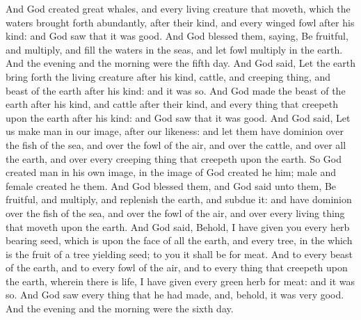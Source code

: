 \begin{biblechapter}
\verse And God created great whales, and every living creature that moveth, which the waters brought forth abundantly, after their kind, and every winged fowl after his kind: and God saw that it was good.
\verse And God blessed them, saying, Be fruitful, and multiply, and fill the waters in the seas, and let fowl multiply in the earth.
\verse And the evening and the morning were the fifth day.
\verse And God said, Let the earth bring forth the living creature after his kind, cattle, and creeping thing, and beast of the earth after his kind: and it was so.
\verse And God made the beast of the earth after his kind, and cattle after their kind, and every thing that creepeth upon the earth after his kind: and God saw that it was good.
\verse And God said, Let us make man in our image, after our likeness: and let them have dominion over the fish of the sea, and over the fowl of the air, and over the cattle, and over all the earth, and over every creeping thing that creepeth upon the earth.
\verse So God created man in his own image, in the image of God created he him; male and female created he them.
\verse And God blessed them, and God said unto them, Be fruitful, and multiply, and replenish the earth, and subdue it: and have dominion over the fish of the sea, and over the fowl of the air, and over every living thing that moveth upon the earth.
\verse And God said, Behold, I have given you every herb bearing seed, which is upon the face of all the earth, and every tree, in the which is the fruit of a tree yielding seed; to you it shall be for meat.
\verse And to every beast of the earth, and to every fowl of the air, and to every thing that creepeth upon the earth, wherein there is life, I have given every green herb for meat: and it was so.
\verse And God saw every thing that he had made, and, behold, it was very good. And the evening and the morning were the sixth day.
\end{biblechapter}

